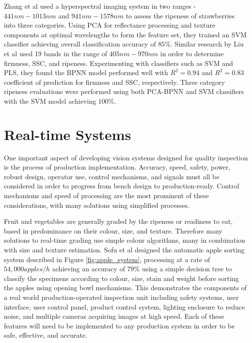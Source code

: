 \documentclass[fleqn,twoside,12pt]{report}
\begin{document}
Zhang et al \cite{zhang} used a hyperspectral imaging system in two ranges - $441nm-1013nm$ and $941nm-1578nm$ to assess the ripeness of strawberries into three categories. Using PCA for reflectance processing and texture components at optimal wavelengths to form the feature set, they trained an SVM classifier achieving overall classification accuracy of $85\%$. Similar research by Liu et al \cite{liu} used 19 bands in the range of $405nm-970nm$ in order to determine firmness, SSC, and ripeness. Experimenting with classifiers such as SVM and PLS, they found the BPNN model performed well with $R^2=0.94$ and $R^2=0.83$ coefficient of prediction for firmness and SSC, respectively. Three category ripeness evaluations were performed using both PCA-BPNN and SVM classifiers with the SVM model achieving $100\%$.

 




\section{Real-time Systems}

One important aspect of developing vision systems designed for quality inspection is the process of production implementation. Accuracy, speed, safety, power, robust design, operator use, control mechanisms, and signals must all be considered in order to progress from bench design to production-ready. Control mechanisms and speed of processing are the most prominent of these considerations, with many solutions using simplified processes.

Fruit and vegetables are generally graded by the ripeness or readiness to eat, based in predominance on their colour, size, and texture. Therefore many solutions to real-time grading use simple colour algorithms, many in combination with size and texture estimation. Sofu et al \cite{sofu} designed the automatic apple sorting system described in Figure \ref{fig:apple_system}, processing at a rate of $54,000 apples/h$ achieving an accuracy of $79\%$ using a simple decision tree to classify the specimens according to colour, size, stain and weight before sorting the apples using opening bowl mechanisms. This demonstrates the components of a real world production-operated inspection unit including safety systems, user interface, user control panel, product control system, lighting enclosure to reduce noise, and multiple cameras acquiring images at high speed. Each of these features will need to be implemented to any production system in order to be safe, effective, and accurate.
\end{document}
